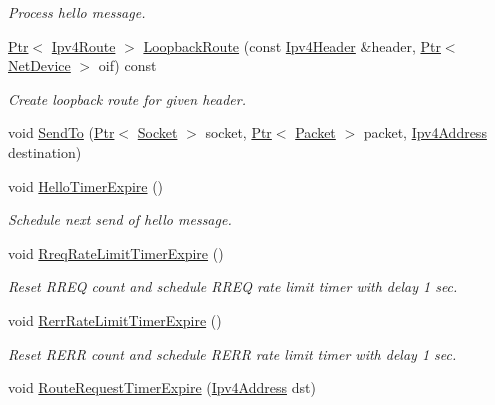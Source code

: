 \begin{DoxyCompactItemize}
\begin{DoxyCompactList}\small\item\em Process hello message. \end{DoxyCompactList}\item 
\hyperlink{classns3_1_1Ptr}{Ptr}$<$ \hyperlink{classns3_1_1Ipv4Route}{Ipv4\+Route} $>$ \hyperlink{classns3_1_1aodv_1_1RoutingProtocol_aa5a41c2ee6ff24a85cfa394d2e061762}{Loopback\+Route} (const \hyperlink{classns3_1_1Ipv4Header}{Ipv4\+Header} \&header, \hyperlink{classns3_1_1Ptr}{Ptr}$<$ \hyperlink{classns3_1_1NetDevice}{Net\+Device} $>$ oif) const 
\begin{DoxyCompactList}\small\item\em Create loopback route for given header. \end{DoxyCompactList}\item 
void \hyperlink{classns3_1_1aodv_1_1RoutingProtocol_a41daaba7b2254917daa563575572c1ed}{Send\+To} (\hyperlink{classns3_1_1Ptr}{Ptr}$<$ \hyperlink{classns3_1_1Socket}{Socket} $>$ socket, \hyperlink{classns3_1_1Ptr}{Ptr}$<$ \hyperlink{classns3_1_1Packet}{Packet} $>$ packet, \hyperlink{classns3_1_1Ipv4Address}{Ipv4\+Address} destination)
\item 
void \hyperlink{classns3_1_1aodv_1_1RoutingProtocol_a4dc002f2942cbcf436d16183c1c71f10}{Hello\+Timer\+Expire} ()
\begin{DoxyCompactList}\small\item\em Schedule next send of hello message. \end{DoxyCompactList}\item 
void \hyperlink{classns3_1_1aodv_1_1RoutingProtocol_aee7a58848233510a151f89c92488c0dd}{Rreq\+Rate\+Limit\+Timer\+Expire} ()
\begin{DoxyCompactList}\small\item\em Reset R\+R\+EQ count and schedule R\+R\+EQ rate limit timer with delay 1 sec. \end{DoxyCompactList}\item 
void \hyperlink{classns3_1_1aodv_1_1RoutingProtocol_a224b04cf88ed78efbc44014502125b53}{Rerr\+Rate\+Limit\+Timer\+Expire} ()
\begin{DoxyCompactList}\small\item\em Reset R\+E\+RR count and schedule R\+E\+RR rate limit timer with delay 1 sec. \end{DoxyCompactList}\item 
void \hyperlink{classns3_1_1aodv_1_1RoutingProtocol_ae2ede2e919e00345ce1ba385c0527611}{Route\+Request\+Timer\+Expire} (\hyperlink{classns3_1_1Ipv4Address}{Ipv4\+Address} dst)

\end{DoxyCompactItemize}
